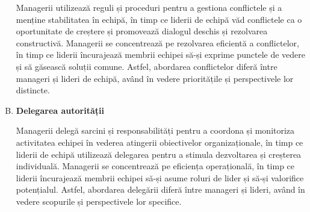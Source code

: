 \documentclass[a4paper, 12pt]{article}
\begin{document}
\begin{enumerate}[A)]
		\quad\quad Managerii utilizează reguli și proceduri pentru a gestiona conflictele și a menține stabilitatea în echipă, în timp ce liderii de echipă văd conflictele ca o oportunitate de creștere și promovează dialogul deschis și rezolvarea constructivă. Managerii se concentrează pe rezolvarea eficientă a conflictelor, în timp ce liderii încurajează membrii echipei să-și exprime punctele de vedere și să găsească soluții comune. Astfel, abordarea conflictelor diferă între manageri și lideri de echipă, având în vedere prioritățile și perspectivele lor distincte.

		\item \textbf{Delegarea autorității}

		\quad\quad Managerii delegă sarcini și responsabilități pentru a coordona și monitoriza activitatea echipei în vederea atingerii obiectivelor organizaționale, în timp ce liderii de echipă utilizează delegarea pentru a stimula dezvoltarea și creșterea individuală. Managerii se concentrează pe eficiența operațională, în timp ce liderii încurajează membrii echipei să-și asume roluri de lider și să-și valorifice potențialul. Astfel, abordarea delegării diferă între manageri și lideri, având în vedere scopurile și perspectivele lor specifice.

	\end{enumerate}

\end{document}
